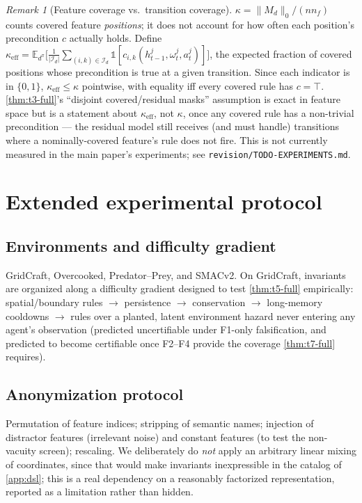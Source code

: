 \documentclass[11pt]{article}
\newcommand{\E}{\mathbb{E}}
\theoremstyle{plain}
\theoremstyle{definition}
\theoremstyle{remark}
\newtheorem{remark}[theorem]{Remark}
\begin{document}
\begin{remark}[Feature coverage vs.\ transition coverage]
$\kappa=\|M_d\|_0/(nn_f)$ counts covered feature \emph{positions}; it does not account for how often each position's precondition $c$ actually holds. Define $\kappa_{\mathrm{eff}}=\E_{d^\pi}\big[\tfrac{1}{|\mathcal{I}_d|}\sum_{(i,k)\in\mathcal{I}_d}\mathbb{1}[c_{i,k}(h^j_{t-1},\omega^j_t,a^j_t)]\big]$, the expected fraction of covered positions whose precondition is true at a given transition. Since each indicator is in $\{0,1\}$, $\kappa_{\mathrm{eff}}\le\kappa$ pointwise, with equality iff every covered rule has $c=\top$. \autoref{thm:t3-full}'s ``disjoint covered/residual masks'' assumption is exact in feature space but is a statement about $\kappa_{\mathrm{eff}}$, not $\kappa$, once any covered rule has a non-trivial precondition --- the residual model still receives (and must handle) transitions where a nominally-covered feature's rule does not fire. This is not currently measured in the main paper's experiments; see \texttt{revision/TODO-EXPERIMENTS.md}.
\end{remark}

\section{Extended experimental protocol}
\label{app:protocol}

\subsection{Environments and difficulty gradient}
GridCraft, Overcooked, Predator--Prey, and SMACv2. On GridCraft, invariants are organized along a difficulty gradient designed to test \autoref{thm:t5-full} empirically: spatial/boundary rules $\to$ persistence $\to$ conservation $\to$ long-memory cooldowns $\to$ rules over a planted, latent environment hazard never entering any agent's observation (predicted uncertifiable under F1-only falsification, and predicted to become certifiable once F2--F4 provide the coverage \autoref{thm:t7-full} requires).

\subsection{Anonymization protocol}
Permutation of feature indices; stripping of semantic names; injection of distractor features (irrelevant noise) and constant features (to test the non-vacuity screen); rescaling. We deliberately do \emph{not} apply an arbitrary linear mixing of coordinates, since that would make invariants inexpressible in the catalog of \autoref{app:dsl}; this is a real dependency on a reasonably factorized representation, reported as a limitation rather than hidden.
\end{document}
